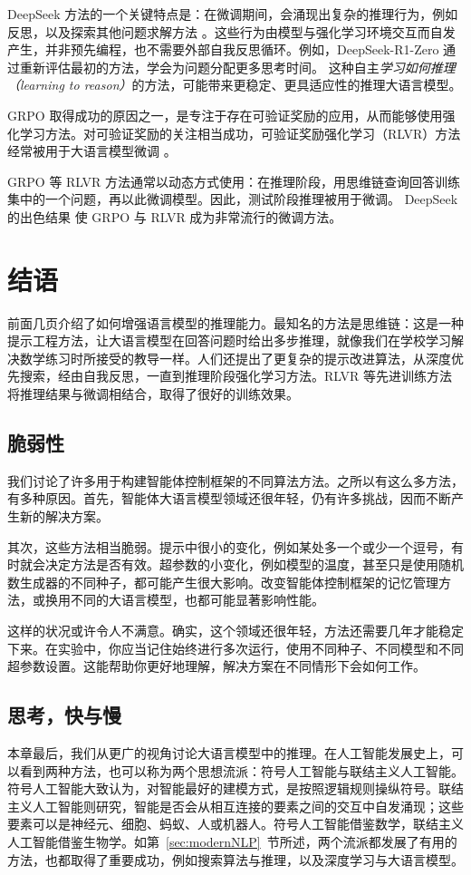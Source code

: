 DeepSeek 方法的一个关键特点是：在微调期间，会涌现出复杂的推理行为，例如反思，以及探索其他问题求解方法 \citep{mercer2025brief}。这些行为由模型与强化学习环境交互而自发产生，并非预先编程，也不需要外部自我反思循环。例如，DeepSeek-R1-Zero 通过重新评估最初的方法，学会为问题分配更多思考时间。
这种自主{\em 学习如何推理（learning to reason）}的方法，可能带来更稳定、更具适应性的推理大语言模型。

GRPO 取得成功的原因之一，是专注于存在可验证奖励的应用，从而能够使用强化学习方法。对可验证奖励的关注相当成功，可验证奖励强化学习（RLVR）方法经常被用于大语言模型微调 \citep{lambert2024tulu}。

GRPO 等 RLVR 方法通常以动态方式使用：在推理阶段，用思维链查询回答训练集中的一个问题，再以此微调模型。因此，测试阶段推理被用于微调。
DeepSeek 的出色结果 \citep{guo2025deepseek} 使 GRPO \citep{shao2024deepseekmath} 与 RLVR \citep{lambert2024tulu,guo2025deepseek,wen2025reinforcement,yue2025does} 成为非常流行的微调方法。

\section{结语}
前面几页介绍了如何增强语言模型的推理能力。最知名的方法是思维链：这是一种提示工程方法，让大语言模型在回答问题时给出多步推理，就像我们在学校学习解决数学练习时所接受的教导一样。人们还提出了更复杂的提示改进算法，从深度优先搜索，经由自我反思，一直到推理阶段强化学习方法。RLVR 等先进训练方法将推理结果与微调相结合，取得了很好的训练效果。

\subsection{脆弱性}
我们讨论了许多用于构建智能体控制框架的不同算法方法。之所以有这么多方法，有多种原因。首先，智能体大语言模型领域还很年轻，仍有许多挑战，因而不断产生新的解决方案。

其次，这些方法相当脆弱。提示中很小的变化，例如某处多一个或少一个逗号，有时就会决定方法是否有效。超参数的小变化，例如模型的温度，甚至只是使用随机数生成器的不同种子，都可能产生很大影响。改变智能体控制框架的记忆管理方法，或换用不同的大语言模型，也都可能显著影响性能。

这样的状况或许令人不满意。确实，这个领域还很年轻，方法还需要几年才能稳定下来。在实验中，你应当记住始终进行多次运行，使用不同种子、不同模型和不同超参数设置。这能帮助你更好地理解，解决方案在不同情形下会如何工作。

\subsection{思考，快与慢}
\label{sec:fast-and-slow}
本章最后，我们从更广的视角讨论大语言模型中的推理。在人工智能发展史上，可以看到两种方法，也可以称为两个思想流派：符号人工智能与联结主义人工智能。符号人工智能大致认为，对智能最好的建模方式，是按照逻辑规则操纵符号。联结主义人工智能则研究，智能是否会从相互连接的要素之间的交互中自发涌现；这些要素可以是神经元、细胞、蚂蚁、人或机器人。符号人工智能借鉴数学，联结主义人工智能借鉴生物学。如第~\ref{sec:modernNLP}~节所述，两个流派都发展了有用的方法，也都取得了重要成功，例如搜索算法与推理，以及深度学习与大语言模型。

